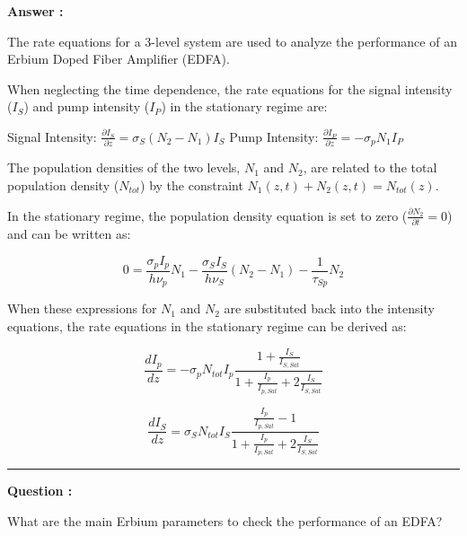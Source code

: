 \documentclass[a4paper,11pt]{book}
\newcounter{qacount}
\newenvironment{question}{
  \refstepcounter{qacount}
  \vspace{1em} %
  \noindent\textbf{Question \theqacount:}\space
}{
  \par %
}
\newenvironment{answer}{
  \noindent\textbf{Answer \theqacount:}\space
}{
  \par\vspace{1em}   %
  \hrule             %
  \vspace{0.5em}     %
}
\begin{document}
\begin{answer}
    The rate equations for a 3-level system are used to analyze the performance of an Erbium Doped Fiber Amplifier (EDFA).

    When neglecting the time dependence, the rate equations for the signal intensity ($I_S$) and pump intensity ($I_P$) in the stationary regime are:

    Signal Intensity: $\frac{\partial I_S}{\partial z} = \sigma_S (N_2 - N_1)I_S$
    Pump Intensity: $\frac{\partial I_P}{\partial z} = -\sigma_p N_1 I_P$

    The population densities of the two levels, $N_1$ and $N_2$, are related to the total population density ($N_{tot}$) by the constraint $N_1(z, t) + N_2(z, t) = N_{tot}(z)$.

    In the stationary regime, the population density equation is set to zero ($\frac{\partial N_2}{\partial t} = 0$) and can be written as:

    $$0 = \frac{\sigma_p I_p}{h\nu_p}N_1 - \frac{\sigma_S I_S}{h\nu_S}(N_2 - N_1) - \frac{1}{\tau_{Sp}}N_2$$

    When these expressions for $N_1$ and $N_2$ are substituted back into the intensity equations, the rate equations in the stationary regime can be derived as:

    $$\frac{dI_p}{dz} = -\sigma_p N_{tot}I_p \frac{1 + \frac{I_S}{I_{S,Sat}}}{1 + \frac{I_p}{I_{p,Sat}} + 2 \frac{I_S}{I_{S,Sat}}}$$

    $$\frac{dI_S}{dz} = \sigma_S N_{tot}I_S \frac{\frac{I_p}{I_{p,Sat}} - 1}{1 + \frac{I_p}{I_{p,Sat}} + 2 \frac{I_S}{I_{S,Sat}}}$$
\end{answer}

\begin{question}
    What are the main Erbium parameters to check the performance of an EDFA?
\end{question}
\end{document}
